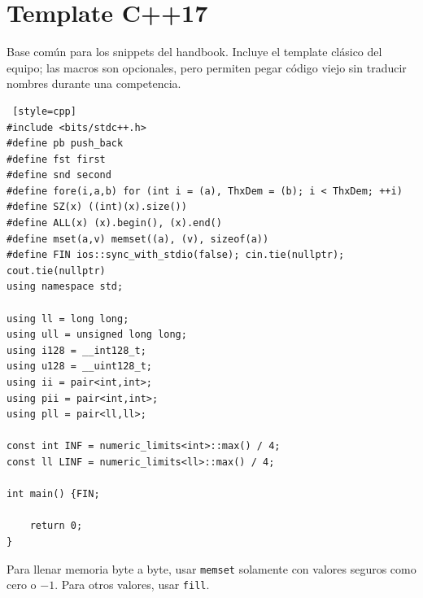 \section{Template C++17}

Base com\'un para los snippets del handbook. Incluye el template cl\'asico del
equipo; las macros son opcionales, pero permiten pegar c\'odigo viejo sin
traducir nombres durante una competencia.

\begin{lstlisting} [style=cpp]
#include <bits/stdc++.h>
#define pb push_back
#define fst first
#define snd second
#define fore(i,a,b) for (int i = (a), ThxDem = (b); i < ThxDem; ++i)
#define SZ(x) ((int)(x).size())
#define ALL(x) (x).begin(), (x).end()
#define mset(a,v) memset((a), (v), sizeof(a))
#define FIN ios::sync_with_stdio(false); cin.tie(nullptr); cout.tie(nullptr)
using namespace std;

using ll = long long;
using ull = unsigned long long;
using i128 = __int128_t;
using u128 = __uint128_t;
using ii = pair<int,int>;
using pii = pair<int,int>;
using pll = pair<ll,ll>;

const int INF = numeric_limits<int>::max() / 4;
const ll LINF = numeric_limits<ll>::max() / 4;

int main() {FIN;

    return 0;
}
\end{lstlisting}

Para llenar memoria byte a byte, usar \texttt{memset} solamente con valores
seguros como cero o $-1$. Para otros valores, usar \texttt{fill}.

